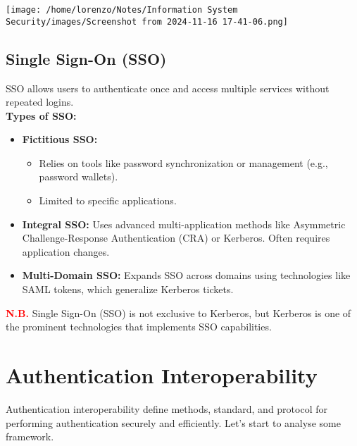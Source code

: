 \begin{enumerate}
\begin{minipage}{0.5\textwidth}
\begin{customquote}
        \end{customquote}
    \end{minipage} 
    \hspace{1cm}
    \begin{minipage}{0.3\textwidth}
        \centering
        \texttt{[image: /home/lorenzo/Notes/Information System Security/images/Screenshot from 2024-11-16 17-41-06.png]}
    \end{minipage}
\end{enumerate}

\subsection{Single Sign-On (SSO)}
SSO allows users to authenticate once and access multiple services without repeated logins.\\
\textbf{Types of SSO:}
\begin{itemize}
    \item \textbf{Fictitious SSO:}
    \begin{itemize}
        \item Relies on tools like password synchronization or management (e.g., password wallets).
        \item Limited to specific applications.
    \end{itemize}
    \item \textbf{Integral SSO:} Uses advanced multi-application methods like Asymmetric Challenge-Response Authentication (CRA) or Kerberos.
    Often requires application changes.
    \item \textbf{Multi-Domain SSO:} Expands SSO across domains using technologies like SAML tokens, which generalize Kerberos tickets.
\end{itemize}
\textcolor{red}{\textbf{N.B.}} Single Sign-On (SSO) is not exclusive to Kerberos, but Kerberos is one of the prominent technologies that implements SSO capabilities.

\section{Authentication Interoperability}
Authentication interoperability define methods, standard, and protocol for performing authentication securely and efficiently. Let's start to analyse some framework.


